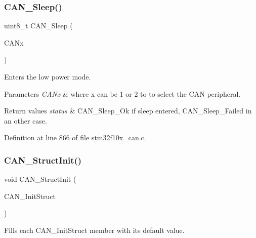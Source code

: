 \subsubsection{\texorpdfstring{C\+A\+N\+\_\+\+Sleep()}{CAN\_Sleep()}}
{\footnotesize\ttfamily uint8\+\_\+t C\+A\+N\+\_\+\+Sleep (\begin{DoxyParamCaption}\item[{\hyperlink{struct_c_a_n___type_def}{C\+A\+N\+\_\+\+Type\+Def} $\ast$}]{C\+A\+Nx }\end{DoxyParamCaption})}



Enters the low power mode. 


\begin{DoxyParams}{Parameters}
{\em C\+A\+Nx} & where x can be 1 or 2 to to select the C\+AN peripheral. \\
\hline
\end{DoxyParams}

\begin{DoxyRetVals}{Return values}
{\em status} & C\+A\+N\+\_\+\+Sleep\+\_\+\+Ok if sleep entered, C\+A\+N\+\_\+\+Sleep\+\_\+\+Failed in an other case. \\
\hline
\end{DoxyRetVals}


Definition at line 866 of file stm32f10x\+\_\+can.\+c.

\mbox{\label{group___c_a_n___exported___functions_gad77ad810868ed111755fc9e8ae0c7646}} 
\subsubsection{\texorpdfstring{C\+A\+N\+\_\+\+Struct\+Init()}{CAN\_StructInit()}}
{\footnotesize\ttfamily void C\+A\+N\+\_\+\+Struct\+Init (\begin{DoxyParamCaption}\item[{\hyperlink{struct_c_a_n___init_type_def}{C\+A\+N\+\_\+\+Init\+Type\+Def} $\ast$}]{C\+A\+N\+\_\+\+Init\+Struct }\end{DoxyParamCaption})}



Fills each C\+A\+N\+\_\+\+Init\+Struct member with its default value. 



